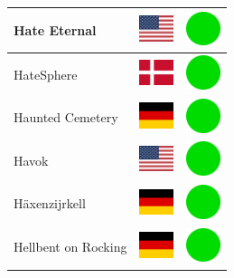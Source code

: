 \documentclass[12pt, a4paper, twoside]{report}
\begin{document}
\begin{center}
\begin{longtable}{|p{5cm}|p{2cm}|p{2cm}|}
 Hate Eternal                                               & \includegraphics[width=1cm]{../4x3/us} &   \includegraphics[width=1cm]{../likes/y} \\ \hline
 HateSphere                                                 & \includegraphics[width=1cm]{../4x3/dk} &   \includegraphics[width=1cm]{../likes/y} \\ \hline
 Haunted Cemetery                                           & \includegraphics[width=1cm]{../4x3/de} &   \includegraphics[width=1cm]{../likes/y} \\ \hline
 Havok                                                      & \includegraphics[width=1cm]{../4x3/us} &   \includegraphics[width=1cm]{../likes/y} \\ \hline
 Häxenzijrkell                                              & \includegraphics[width=1cm]{../4x3/de} &   \includegraphics[width=1cm]{../likes/y} \\ \hline
 Hellbent on Rocking                                        & \includegraphics[width=1cm]{../4x3/de} &   \includegraphics[width=1cm]{../likes/y} \\ \hline

\end{longtable}
\end{center}
\end{document}
